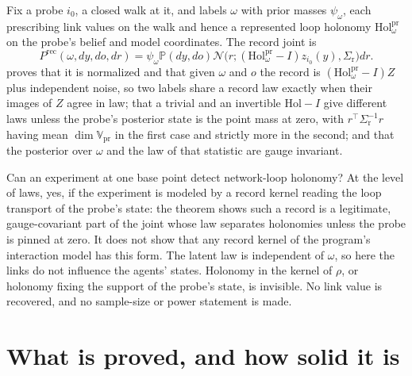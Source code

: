 Fix a probe $i_0$, a closed walk at it, and labels $\omega$ with prior masses $\psi_\omega$, each
prescribing link values on the walk and hence a represented loop holonomy
$\mathrm{Hol}^{\mathrm{pr}}_\omega$ on the probe's belief and model coordinates. The record joint is
\[
P^{\mathrm{rec}}(\omega,dy,do,dr)=\psi_\omega\mathbb P(dy,do)
\mathcal N\bigl(r;(\mathrm{Hol}^{\mathrm{pr}}_\omega-I)z_{i_0}(y),\Sigma_{\mathrm r}\bigr)dr.
\]
 proves that it is normalized and that given $\omega$ and $o$ the
record is $(\mathrm{Hol}^{\mathrm{pr}}_\omega-I)Z$ plus independent noise, so two labels share a record
law exactly when their images of $Z$ agree in law; that a trivial and an invertible $\mathrm{Hol}-I$ give
different laws unless the probe's posterior state is the point mass at zero, with
$r^\top\Sigma_{\mathrm r}^{-1}r$ having mean $\dim\mathbb V_{\mathrm{pr}}$ in the first case and strictly more
in the second; and that the posterior over $\omega$ and the law of that statistic are gauge invariant.

Can an experiment at one base point detect network-loop holonomy? At the level of laws, yes, if the
experiment is modeled by a record kernel reading the loop transport of the probe's state: the theorem
shows such a record is a legitimate, gauge-covariant part of the joint whose law separates holonomies
unless the probe is pinned at zero. It does not show that any record kernel of the program's interaction
model has this form. The latent law is independent of $\omega$, so here the links do not influence the
agents' states. Holonomy in the kernel of $\rho$, or holonomy fixing the support of the probe's state, is
invisible. No link value is recovered, and no sample-size or power statement is made.

\section{What is proved, and how solid it is}
\label{comp:ch10-status}

